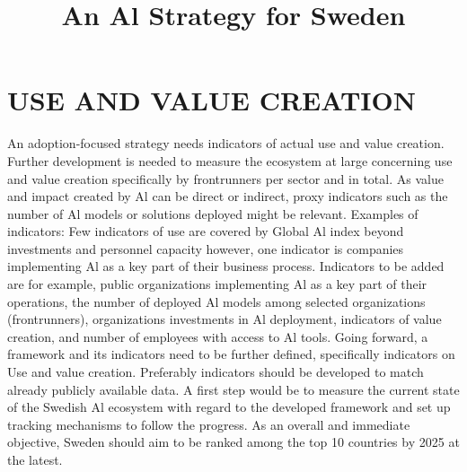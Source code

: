 \section*{USE AND VALUE CREATION}
An adoption-focused strategy needs indicators of actual use and value creation. Further development is needed to measure the ecosystem at large concerning use and value creation specifically by frontrunners per sector and in total. As value and impact created by Al can be direct or indirect, proxy indicators such as the number of Al models or solutions deployed might be relevant.
Examples of indicators:
Few indicators of use are covered by Global Al index beyond investments and personnel capacity however, one indicator is companies implementing Al as a key part of their business process.
Indicators to be added are for example, public organizations implementing Al as a key part of their operations, the number of deployed Al models among selected organizations (frontrunners), organizations investments in Al deployment, indicators of value creation, and number of employees with access to Al tools.
Going forward, a framework and its indicators need to be further defined, specifically indicators on Use and value creation. Preferably indicators should be developed to match already publicly available data. A first step would be to measure the current state of the Swedish Al ecosystem with regard to the developed framework and set up tracking mechanisms to follow the progress.
As an overall and immediate objective, Sweden should aim to be ranked among the top 10 countries by 2025 at the latest.

\title{
An Al Strategy for Sweden
}
